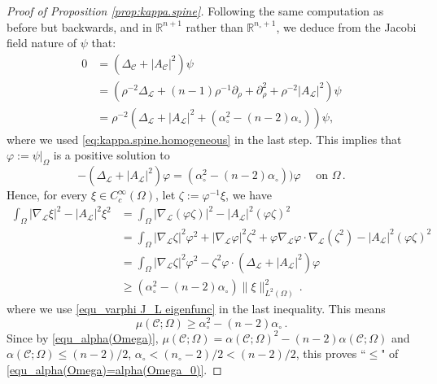 \documentclass[10pt,a4paper]{amsart}
\newcommand{\RR}{\mathbb{R}}
\newcommand{\cC}{\mathcal{C}}
\newcommand{\cL}{\mathcal{L}}
\begin{document}
\begin{proof}[Proof of Proposition \ref{prop:kappa.spine}]
	Following the same computation as before but backwards, and in $\RR^{n+1}$ rather than $\RR^{n_\circ+1}$, we deduce from the Jacobi field nature of $\psi$ that:
	\begin{align*}
		0   & = (\Delta_{\cC} + |A_{\cC}|^2) \psi \\
			& = \left(\rho^{-2} \Delta_{\cL} + (n-1) \rho^{-1} \partial_\rho + \partial_\rho^2 + \rho^{-2} |A_{\cL}|^2\right) \psi \\
			& = \rho^{-2} (\Delta_{\cL} + |A_{\cL}|^2 + (\alpha_{\circ}^2 - (n-2) \alpha_{\circ})) \psi,
	\end{align*}
	where we used \eqref{eq:kappa.spine.homogeneous} in the last step. This implies that $\varphi:= \psi|_{\Omega}$ is a positive solution to 
    \begin{equation} \label{equ_varphi J_L eigenfunc}
      -(\Delta_{\cL} + |A_{\cL}|^2)\varphi = (\alpha_{\circ}^2 - (n-2) \alpha_{\circ})) \varphi \quad \text{ on }\Omega\,.         
    \end{equation}
    Hence, for every $\xi\in C^\infty_c(\Omega)$, let $\zeta:= \varphi^{-1}\xi$, we have 
    \begin{align*}
      \int_\Omega |\nabla_\cL\xi|^2 - |A_\cL|^2\xi^2 
      & = \int_\Omega |\nabla_\cL(\varphi\zeta)|^2 - |A_\cL|^2(\varphi\zeta)^2 \\
      & = \int_\Omega |\nabla_\cL\zeta|^2\varphi^2 + |\nabla_\cL\varphi|^2\zeta^2 + \varphi\nabla_\cL\varphi\cdot \nabla_\cL(\zeta^2) - |A_\cL|^2(\varphi\zeta)^2 \\
      & = \int_\Omega |\nabla_\cL\zeta|^2\varphi^2 - \zeta^2\varphi\cdot (\Delta_\cL + |A_\cL|^2)\varphi \\
      & \geq (\alpha_\circ^2 - (n-2)\alpha_\circ)\|\xi\|_{L^2(\Omega)}^2 \,.
    \end{align*}
    where we use \eqref{equ_varphi J_L eigenfunc} in the last inequality. This means \[
      \mu(\cC; \Omega) \geq \alpha_\circ^2 - (n-2)\alpha_\circ\,.
    \]
    Since by \eqref{equ_alpha(Omega)}, $\mu(\cC; \Omega) = \alpha(\cC; \Omega)^2 - (n-2)\alpha(\cC; \Omega)$ and $\alpha(\cC;\Omega)\leq (n-2)/2$, $\alpha_\circ< (n_\circ-2)/2<(n-2)/2$, this proves ``$\leq$" of \eqref{equ_alpha(Omega)=alpha(Omega_0)}.


\end{proof}
\end{document}
